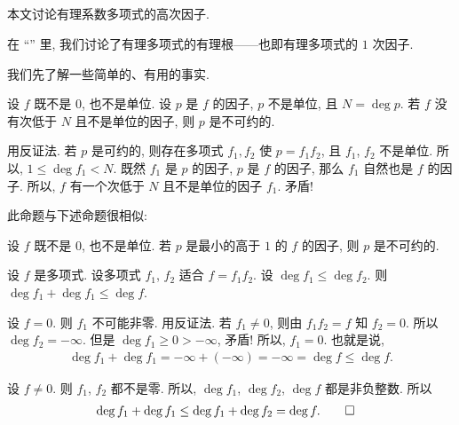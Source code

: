 \subsection*{\FactorsOfHigherDegreeOfPolynomialsOverQ}
\markright{\FactorsOfHigherDegreeOfPolynomialsOverQ}

本文讨论有理系数多项式的高次因子.

在 ``\RationalRootsOfPolynomialsOverQ '' 里, 我们讨论了有理多项式的有理根——也即有理多项式的 $1$ 次因子.

我们先了解一些简单的、有用的事实.

\begin{proposition}
    设 $f$ 既不是 $0$, 也不是单位. 设 $p$ 是 $f$ 的因子, $p$ 不是单位, 且 $N = \deg p$. 若 $f$ 没有次低于 $N$ 且不是单位的因子, 则 $p$ 是不可约的.
\end{proposition}

\begin{pf}
    用反证法. 若 $p$ 是可约的, 则存在多项式 $f_1, f_2$ 使 $p = f_1 f_2$, 且 $f_1$, $f_2$ 不是单位. 所以, $1 \leq \deg f_1 < N$. 既然 $f_1$ 是 $p$ 的因子, $p$ 是 $f$ 的因子, 那么 $f_1$ 自然也是 $f$ 的因子. 所以, $f$ 有一个次低于 $N$ 且不是单位的因子 $f_1$. 矛盾!
\end{pf}

\begin{remark}
    此命题与下述命题很相似:

    设 $f$ 既不是 $0$, 也不是单位. 若 $p$ 是最小的高于 $1$ 的 $f$ 的因子, 则 $p$ 是不可约的.
\end{remark}

\begin{proposition}
    设 $f$ 是多项式. 设多项式 $f_1$, $f_2$ 适合 $f = f_1 f_2$. 设 $\deg f_1 \leq \deg f_2$. 则 $\deg f_1 + \deg f_1 \leq \deg f$.
\end{proposition}

\begin{pf}
    设 $f = 0$. 则 $f_1$ 不可能非零. 用反证法. 若 $f_1 \neq 0$, 则由 $f_1 f_2 = f$ 知 $f_2 = 0$. 所以 $\deg f_2 = -\infty$. 但是 $\deg f_1 \geq 0 > -\infty$, 矛盾! 所以, $f_1 = 0$. 也就是说,
    \begin{align*}
        \deg f_1 + \deg f_1 = -\infty + (-\infty) = -\infty = \deg f \leq \deg f.
    \end{align*}

    设 $f \neq 0$. 则 $f_1$, $f_2$ 都不是零. 所以, $\deg f_1$, $\deg f_2$, $\deg f$ 都是非负整数. 所以
    \begin{align*}
         & \deg f_1 + \deg f_1 \leq \deg f_1 + \deg f_2 = \deg f. \qedhere
    \end{align*}
\end{pf}

